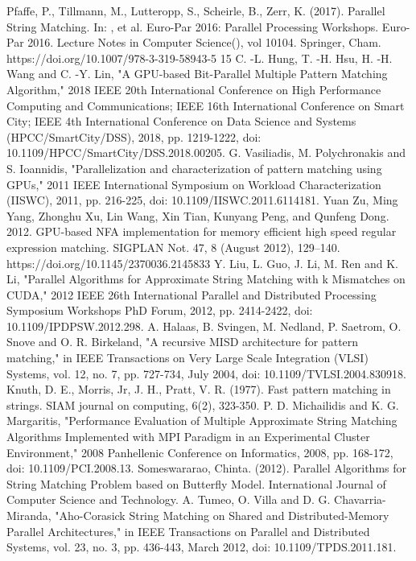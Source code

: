 \documentclass[11pt]{article}       %
\begin{document}
%
\begin{thebibliography}{99}  
Pfaffe, P., Tillmann, M., Lutteropp, S., Scheirle, B., Zerr, K. (2017). Parallel String Matching. In: , et al. Euro-Par 2016: Parallel Processing Workshops. Euro-Par 2016. Lecture Notes in Computer Science(), vol 10104. Springer, Cham. {https://doi.org/10.1007/978-3-319-58943-5 15}
C. -L. Hung, T. -H. Hsu, H. -H. Wang and C. -Y. Lin, "A GPU-based Bit-Parallel Multiple Pattern Matching Algorithm," 2018 IEEE 20th International Conference on High Performance Computing and Communications; IEEE 16th International Conference on Smart City; IEEE 4th International Conference on Data Science and Systems (HPCC/SmartCity/DSS), 2018, pp. 1219-1222, doi: 10.1109/HPCC/SmartCity/DSS.2018.00205.
G. Vasiliadis, M. Polychronakis and S. Ioannidis, "Parallelization and characterization of pattern matching using GPUs," 2011 IEEE International Symposium on Workload Characterization (IISWC), 2011, pp. 216-225, doi: 10.1109/IISWC.2011.6114181.
Yuan Zu, Ming Yang, Zhonghu Xu, Lin Wang, Xin Tian, Kunyang Peng, and Qunfeng Dong. 2012. GPU-based NFA implementation for memory efficient high speed regular expression matching. SIGPLAN Not. 47, 8 (August 2012), 129–140. https://doi.org/10.1145/2370036.2145833
Y. Liu, L. Guo, J. Li, M. Ren and K. Li, "Parallel Algorithms for Approximate String Matching with k Mismatches on CUDA," 2012 IEEE 26th International Parallel and Distributed Processing Symposium Workshops PhD Forum, 2012, pp. 2414-2422, doi: 10.1109/IPDPSW.2012.298.
A. Halaas, B. Svingen, M. Nedland, P. Saetrom, O. Snove and O. R. Birkeland, "A recursive MISD architecture for pattern matching," in IEEE Transactions on Very Large Scale Integration (VLSI) Systems, vol. 12, no. 7, pp. 727-734, July 2004, doi: 10.1109/TVLSI.2004.830918.
Knuth, D. E., Morris, Jr, J. H., Pratt, V. R. (1977). Fast pattern matching in strings. SIAM journal on computing, 6(2), 323-350.
P. D. Michailidis and K. G. Margaritis, "Performance Evaluation of Multiple Approximate String Matching Algorithms Implemented with MPI Paradigm in an Experimental Cluster Environment," 2008 Panhellenic Conference on Informatics, 2008, pp. 168-172, doi: 10.1109/PCI.2008.13.
Someswararao, Chinta. (2012). Parallel Algorithms for String Matching Problem based on Butterfly Model. International Journal of Computer Science and Technology. 
A. Tumeo, O. Villa and D. G. Chavarria-Miranda, "Aho-Corasick String Matching on Shared and Distributed-Memory Parallel Architectures," in IEEE Transactions on Parallel and Distributed Systems, vol. 23, no. 3, pp. 436-443, March 2012, doi: 10.1109/TPDS.2011.181.
\end{thebibliography}


\end{document}
